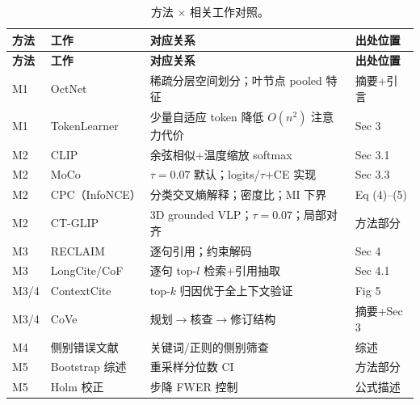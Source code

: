 \documentclass[11pt,a4paper]{article}
\theoremstyle{definition}
\begin{document}
\begin{longtable}{p{1cm}p{3cm}p{7cm}p{2.5cm}}
\caption{方法 $\times$ 相关工作对照。}\label{tab:related}\\
\toprule
\textbf{方法} & \textbf{工作} & \textbf{对应关系} & \textbf{出处位置} \\
\midrule\endfirsthead
\toprule
\textbf{方法} & \textbf{工作} & \textbf{对应关系} & \textbf{出处位置} \\
\midrule\endhead

M1 & OctNet & 稀疏分层空间划分；叶节点 pooled 特征 & 摘要+引言 \\
M1 & TokenLearner & 少量自适应 token 降低 $O(n^2)$ 注意力代价 & Sec 3 \\
M2 & CLIP & 余弦相似+温度缩放 softmax & Sec 3.1 \\
M2 & MoCo & $\tau=0.07$ 默认；logits/$\tau$+CE 实现 & Sec 3.3 \\
M2 & CPC（InfoNCE） & 分类交叉熵解释；密度比；MI 下界 & Eq (4)--(5) \\
M2 & CT-GLIP & 3D grounded VLP；$\tau=0.07$；局部对齐 & 方法部分 \\
M3 & RECLAIM & 逐句引用；约束解码 & Sec 4 \\
M3 & LongCite/CoF & 逐句 top-$l$ 检索+引用抽取 & Sec 4.1 \\
M3/4 & ContextCite & top-$k$ 归因优于全上下文验证 & Fig 5 \\
M3/4 & CoVe & 规划$\to$核查$\to$修订结构 & 摘要+Sec 3 \\
M4 & 侧别错误文献 & 关键词/正则的侧别筛查 & 综述 \\
M5 & Bootstrap 综述 & 重采样分位数 CI & 方法部分 \\
M5 & Holm 校正 & 步降 FWER 控制 & 公式描述 \\
\bottomrule
\end{longtable}
\end{document}
